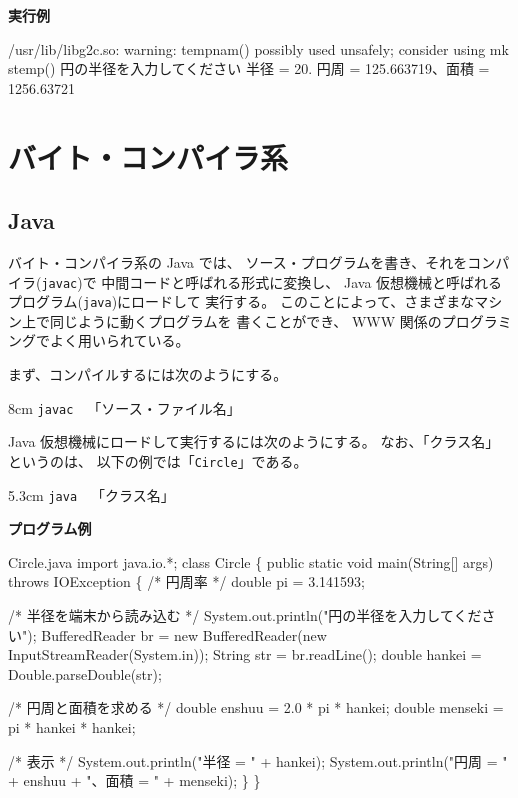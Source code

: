 \noindent
\textbf{実行例}

\begin{progls}
/usr/lib/libg2c.so: warning: tempnam() possibly used unsafely; consider using mk
stemp()
 円の半径を入力してください
 半径 =   20.
 円周 =   125.663719、面積 =   1256.63721
%
\end{progls}

\newpage

\section{バイト・コンパイラ系}

\subsection{Java}

バイト・コンパイラ系の Java では、
ソース・プログラムを書き、それをコンパイラ(\texttt{javac})で
中間コードと呼ばれる形式に変換し、
 Java 仮想機械と呼ばれるプログラム(\texttt{java})にロードして
実行する。
このことによって、さまざまなマシン上で同じように動くプログラムを
書くことができ、 WWW 関係のプログラミングでよく用いられている。

まず、コンパイルするには次のようにする。

\begin{coml}{8cm}
\texttt{javac}~~「ソース・ファイル名」
\end{coml}

Java 仮想機械にロードして実行するには次のようにする。
なお、「クラス名」というのは、
以下の例では「\texttt{Circle}」である。

\begin{coml}{5.3cm}
\texttt{java}~~「クラス名」
\end{coml}

\noindent
\textbf{プログラム例}

\begin{progls2}{Circle.java}
import java.io.*;
class Circle \{
  public static void main(String[] args) throws IOException \{
    /* 円周率 */
    double pi = 3.141593;

    /* 半径を端末から読み込む */
    System.out.println("円の半径を入力してください");
    BufferedReader br = new BufferedReader(new InputStreamReader(System.in));
    String str = br.readLine();
    double hankei = Double.parseDouble(str);

    /* 円周と面積を求める */
    double enshuu = 2.0 * pi * hankei;
    double menseki = pi * hankei * hankei;

    /* 表示 */
    System.out.println("半径 = " + hankei);
    System.out.println("円周 = " + enshuu + "、面積 = " + menseki);
  \}
\}
\end{progls2}

